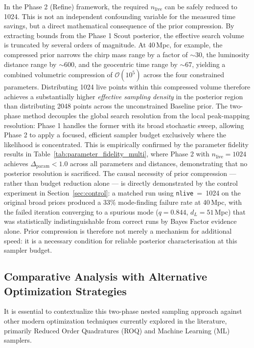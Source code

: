\documentclass[12pt]{article}
\begin{document}
In the Phase 2 (Refine) framework, the required $n_{\text{live}}$ can be safely reduced to 1024. This is not an independent confounding variable for the measured time savings, but a direct mathematical consequence of the prior compression. By extracting bounds from the Phase 1 Scout posterior, the effective search volume is truncated by several orders of magnitude. At 40\,Mpc, for example, the compressed prior narrows the chirp mass range by a factor of $\sim$30, the luminosity distance range by $\sim$600, and the geocentric time range by $\sim$67, yielding a combined volumetric compression of $\mathcal{O}(10^5)$ across the four constrained parameters. Distributing 1024 live points within this compressed volume therefore achieves a substantially higher \textit{effective sampling density} in the posterior region than distributing 2048 points across the unconstrained Baseline prior. The two-phase method decouples the global search resolution from the local peak-mapping resolution: Phase 1 handles the former with its broad stochastic sweep, allowing Phase 2 to apply a focused, efficient sampler budget exclusively where the likelihood is concentrated. This is empirically confirmed by the parameter fidelity results in Table~\ref{tab:parameter_fidelity_multi}, where Phase 2 with $n_{\text{live}} = 1024$ achieves $\Delta_{\text{param}} < 1.0$ across all parameters and distances, demonstrating that no posterior resolution is sacrificed. The causal necessity of prior compression — rather than budget reduction alone — is directly demonstrated by the control experiment in Section~\ref{sec:control}: a matched run using \texttt{nlive}~=~1024 on the original broad priors produced a 33\% mode-finding failure rate at 40\,Mpc, with the failed iteration converging to a spurious mode ($q = 0.844$, $d_L = 51$\,Mpc) that was statistically indistinguishable from correct runs by Bayes Factor evidence alone. Prior compression is therefore not merely a mechanism for additional speed: it is a necessary condition for reliable posterior characterisation at this sampler budget.

\subsection{Comparative Analysis with Alternative Optimization Strategies}
It is essential to contextualize this two-phase nested sampling approach against other modern optimization techniques currently explored in the literature, primarily Reduced Order Quadratures (ROQ) and Machine Learning (ML) samplers.
\end{document}
